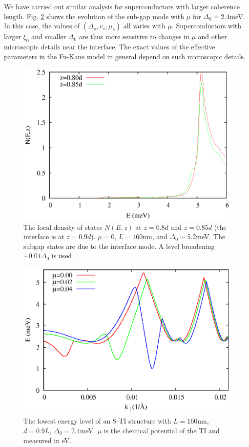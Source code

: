 We have carried out similar analysis for superconductors with larger
coherence length. Fig. \ref{level-27} shows the evolution of
the sub-gap mode with $\mu$ for $\Delta_0=2.4$meV. In this case,
the values of $(\Delta_s,v_s,\mu_s)$ all varies with $\mu$. 
Superconductors with larger $\xi_0$ and smaller $\Delta_0$ are thus more
sensitive to changes in $\mu$ and other microscopic details near
the interface. The exact values of the effective parameters 
in the Fu-Kane model in general depend on such microscopic details.

\begin{figure}
\center
\includegraphics[width=\textwidth]{include/dos.eps}
\caption{The local density of states $N(E,z)$
at $z=0.8d$ and $z=0.85d$ (the interface is at $z=0.9d$).
$\mu=0$, $L=160$nm, and $\Delta_0\sim$5.2meV. The subgap
states are due to the interface mode. A level broadening
$\sim 0.01\Delta_0$ is used.
}\label{dos}
\end{figure}

\begin{figure}
\center
\includegraphics[width=\textwidth]{include/spg27.eps}
\caption{The lowest energy level of an S-TI structure with $L=160$nm,
$d=0.9L$, $\Delta_0=2.4$meV. $\mu$ is the chemical potential of the TI and
measured in eV.}\label{level-27}
\end{figure}

